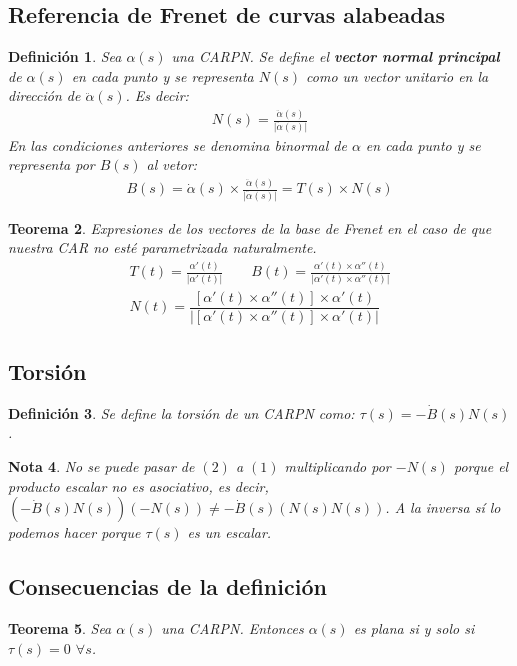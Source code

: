 \documentclass[twoside]{article}
\newtheorem{theorem}{Teorema}[section]
\newtheorem{defi}[theorem]{Definición}
\newtheorem{nota}[theorem]{Nota}
\numberwithin{equation}{section}
\providecommand{\abs}[1]{\lvert#1\rvert}
\begin{document}
\subsection{Referencia de Frenet de curvas alabeadas}
\begin{defi}
Sea $\alpha(s)$ una CARPN. Se define el \textbf{vector normal principal} de $\alpha(s)$ en cada punto y se representa $N(s)$ como un vector unitario en la dirección de $\ddot{\alpha}(s)$. Es decir:
\begin{gather*}
N(s)=\frac{\ddot{\alpha}(s)}{\abs{\ddot{\alpha}(s)}}
\end{gather*}
En las condiciones anteriores se denomina binormal de $\alpha$ en cada punto y se representa por $B(s)$ al vetor:
\begin{gather*}
B(s)=\dot{\alpha}(s)\times\frac{\ddot{\alpha}(s)}{\abs{\ddot{\alpha}(s)}}=T(s)\times N(s)
\end{gather*}
\end{defi}
\begin{theorem} Expresiones de los vectores de la base de Frenet en el caso de que nuestra CAR no esté parametrizada naturalmente.
\begin{gather*}
T(t)=\frac{\alpha'(t)}{\abs{\alpha'(t)}} \qquad B(t)=\frac{\alpha'(t)\times\alpha''(t)}{\abs{\alpha'(t)\times\alpha''(t)}}\\
N(t)=\dfrac{[\alpha'(t)\times\alpha''(t)]\times\alpha'(t)}{\abs{[\alpha'(t)\times\alpha''(t)]\times\alpha'(t)}}
\end{gather*}
\end{theorem}
\subsection{Torsión}
\begin{defi}
Se define la torsión de un CARPN como: $\boxed{\tau(s)=-\dot{B}(s)N(s)}$.
\end{defi}
\begin{nota} No se puede pasar de $(2)$ a $(1)$ multiplicando por $-N(s)$ porque el producto escalar no es asociativo, es decir, $(-\dot{B}(s)N(s))(-N(s))\neq -\dot{B}(s)(N(s)N(s))$. A la inversa sí lo podemos hacer porque $\tau(s)$ es un escalar.
\end{nota}
\subsection{Consecuencias de la definición}
\begin{theorem}
Sea $\alpha(s)$ una CARPN. Entonces $\alpha(s)$ es plana si y solo si $\tau(s)=0$ $\forall s$.
\end{theorem}
\end{document}
